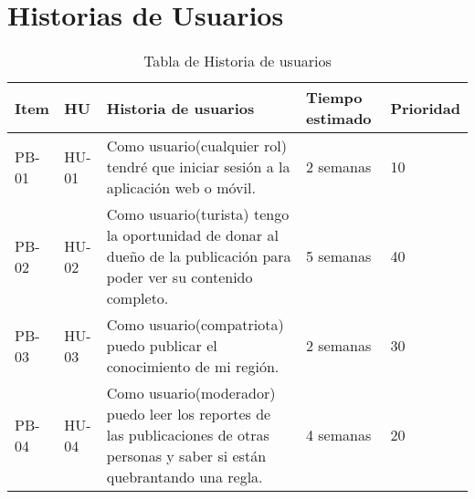 \chapter{Historias de Usuarios}
\begin{table}[htbp]
	\begin{center}
		\begin{tabular}{|l|l|p{5cm}|l|l|}
			\hline
			Item &HU&Historia de usuarios&Tiempo estimado&Prioridad \\
			\hline \hline
			PB-01&HU-01&
			Como usuario(cualquier rol) tendré que iniciar sesión a la aplicación web o móvil.
			&2 semanas&10
			\\ \hline
			PB-02&HU-02&
			Como usuario(turista) tengo la oportunidad de donar al dueño de la publicación para poder ver su contenido completo.
			&5 semanas&40
			\\ \hline
			PB-03&HU-03&
			Como usuario(compatriota) puedo publicar el conocimiento de mi región.
			&2 semanas&30
			\\ \hline
			PB-04&HU-04&
			Como usuario(moderador) puedo leer los reportes de las publicaciones de otras personas y saber si están quebrantando una regla.
			&4 semanas&20
			\\ \hline						
		\end{tabular}
		\caption {Tabla de Historia de usuarios}
	\end{center}
\end{table}